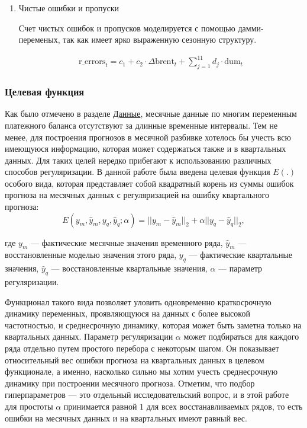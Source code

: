 \documentclass[a4paper, 14pt]{extarticle}
\newcommand{\lsum}{\sum\limits}
\begin{document}
\begin{enumerate}
		\newpage
		\item Чистые ошибки и пропуски
		
		Счет чистых ошибок и пропусков моделируется с помощью дамми-переменых, так как имеет ярко выраженную сезонную структуру.
		
		\begin{align*}
		\text{r\_errors}_t = c_1 + c_2\cdot \Delta \text{brent}_t  + \lsum_{j = 1}^{11} d_j \cdot \text{dum}_t
		\end{align*}
\end{enumerate}

\subsubsection{Целевая функция}\label{sub:costfunction}

Как было отмечено в разделе \hyperref[sub:data]{Данные}, месячные данные по многим переменным платежного баланса отсутствуют за длинные временные интервалы.
Тем не менее, для построения прогнозов в месячной разбивке хотелось бы учесть всю имеющуюся информацию, которая может содержаться также и в квартальных данных. 
Для таких целей нередко прибегают к использованию различных способов регуляризации.
В данной работе была введена целевая функция $E(.)$ особого вида, которая представляет собой квадратный корень из суммы ошибок прогноза на месячных данных с регуляризацией на ошибку квартального прогноза:
\[
E(y_m, \hat y_m, y_q, \hat y_q; \alpha) = || y_m - \hat y_m ||_2 + \alpha|| y_q - \hat y_q ||_2,
\]

где $y_m$ — фактические месячные значения временного ряда, $\hat y_m$ — восстановленные моделью значения этого ряда, $y_q$ — фактические квартальные значения, $\hat y_q$ — восстановленные квартальные значения, $\alpha$ — параметр регуляризации.

Функционал такого вида позволяет уловить одновременно краткосрочную динамику переменных, проявляющуюся на данных с более высокой частотностью, и среднесрочную динамику, которая может быть заметна только на квартальных данных.
Параметр регуляризации $\alpha$ может подбираться для каждого ряда отдельно путем простого перебора с некоторым шагом. 
Он показывает относительный вес ошибки прогноза на квартальных данных в целевом функционале, а именно, насколько сильно мы хотим учесть среднесрочную динамику при построении месячного прогноза.
Отметим, что подбор гиперпараметров — это отдельный исследовательский вопрос, и в этой работе для простоты  $\alpha$ принимается равной $1$ для всех восстанавливаемых рядов, то есть ошибки на месячных данных и на квартальных имеют равный вес.
\end{document}

